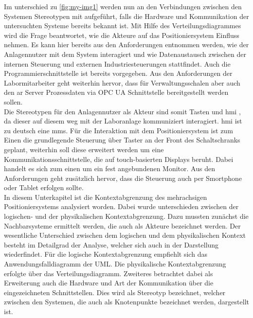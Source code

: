 \documentclass[../Bachelorarbeit.tex]{subfiles}
\begin{document}
Im unterschied zu \autoref{fig:my-img1} werden nun an den Verbindungen zwischen den Systemen Stereotypen mit aufgeführt, falls die Hardware und Kommunikation der untersuchten Systeme bereits bekannt ist. Mit Hilfe des Verteilungsdiagrammes wird die Frage beantwortet, wie die Akteure auf das Positioniersystem Einfluss nehmen. Es kann hier bereits aus den Anforderungen entnommen werden, wie der Anlagennutzer mit dem System interagiert und wie Datenaustausch zwischen der internen Steuerung und externen Industriesteuerungen stattfindet. Auch die Programmierschnittstelle ist bereits vorgegeben. Aus den Anforderungen der Labormitarbeiter geht weiterhin hervor, dass für Verwaltungsschalen aber auch den \ac{ar} Server Prozessdaten via OPC UA Schnittstelle bereitgestellt werden sollen.\\
Die Stereotypen für \zB den Anlagennutzer als Akteur sind somit \glqq Tasten\grqq{} und \glqq \acs{hmi} \grqq{}, da dieser auf diesem weg mit der Laboranlage kommuniziert \bzw interagiert. \ac{hmi} ist zu deutsch eine \ac{mms}. Für die Interaktion mit dem Positioniersystem ist zum Einen die grundlegende Steuerung über Taster an der Front des Schaltschranks geplant, weiterhin soll diese erweitert werden um eine Kommunikationsschnittstelle, die auf touch-basierten Displays beruht. Dabei handelt es sich zum einen um ein fest angebundenen Monitor. Aus den Anforderungen geht zusätzlich hervor, dass die Steuerung auch per Smortphone oder Tablet erfolgen sollte.\\
\bigskip
\newline
In diesem Unterkapitel ist die Kontextabgrenzung des mehrachsigen Positioniersystems analysiert worden. Dabei wurde unterschieden zwischen der logischen- und der physikalischen Kontextabgrenzung. Dazu mussten zunächst die Nachbarsysteme ermittelt werden, die auch als Akteure bezeichnet werden. Der wesentliche Unterschied zwischen dem logischen und dem physikalischen Kontext besteht im Detailgrad der Analyse, welcher sich auch in der Darstellung wiederfindet. Für die logische Kontextabgrenzung empfiehlt sich das Anwendungsfalldiagramm der UML. Die physikalische Kontextabgrenzung erfolgte über das Verteilungsdiagramm. Zweiteres betrachtet dabei als Erweiterung auch die Hardware und Art der Kommunikation über die eingezeichneten Schnittstellen. Dies wird als Stereotyp bezeichnet, welcher zwischen den Systemen, die auch als Knotenpunkte bezeichnet werden, dargestellt ist.
\end{document}
